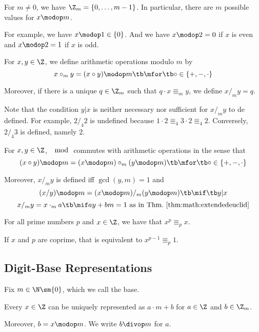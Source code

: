 \begin{remark}
For $m\neq 0$, we have $\Z_m=\{0,\ldots,m-1\}$.
In particular, there are $m$ possible values for $x\modop m$.

For example, we have $x\modop 1\in \{0\}$.
And we have $x\modop 2=0$ if $x$ is even and $x\modop 2=1$ if $x$ is odd.
\end{remark}

\begin{definition}\label{def:math:moduloarith}
For $x,y\in\Z$, we define arithmetic operations modulo $m$ by \[x\circ_m y = (x\circ y)\modop m \tb\mfor\tb \circ \in\{+,-,\cdot\}\]

Moreover, if there is a unique $q\in\Z_m$ such that $q\cdot x\Equiv_m y$, we define $x/_m y=q$.
\end{definition}

Note that the condition $y|x$ is neither necessary nor sufficient for $x/_m y$ to de defined.
For example, $2/_4 2$ is undefined because $1\cdot 2\Equiv_4 3\cdot 2\Equiv_4 2$.
Conversely, $2/_4 3$ is defined, namely $2$.

\begin{theorem}\label{thm:math:moduloarith}
For $x,y\in\Z$, $\mod$ commutes with arithmetic operations in the sense that
 \[(x\circ y)\modop m=(x\modop m)\circ_m (y\modop m) \tb\mfor\tb \circ \in\{+,-,\cdot\}\]

Moreover, $x/_m y$ is defined iff $\gcd(y,m)=1$ and
 \[(x/y)\modop m=(x \modop m)/_m (y\modop m) \tb\mif\tb y|x\]
 \[x/_m y=x\cdot_m a \tb\mif ay+bm=1 \text{ as in Thm.~\ref{thm:math:extendedeuclid}}\]
\end{theorem}

\begin{theorem}\label{thm:math:fermatlittle}
For all prime numbers $p$ and $x\in\Z$, we have that $x^p\Equiv_p x$.

If $x$ and $p$ are coprime, that is equivalent to $x^{p-1}\Equiv_p 1$.
\end{theorem}

\subsection{Digit-Base Representations}\label{sec:math:base}

Fix $m\in \N\sm\{0\}$, which we call the base.
\medskip

\begin{theorem}
Every $x\in\Z$ can be uniquely represented as $a\cdot m+b$ for $a\in\Z$ and $b\in\Z_m$.

Moreover, $b=x\modop m$.
We write $b\divop m$ for $a$.
\end{theorem}

